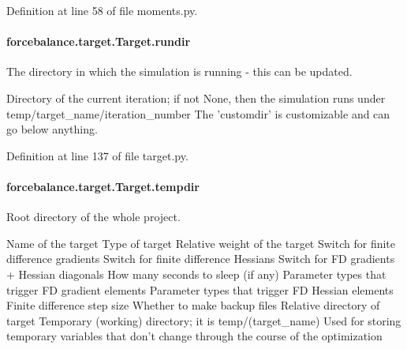 Definition at line 58 of file moments.\-py.

\hypertarget{classforcebalance_1_1target_1_1Target_a6872de5b2d4273b82336ea5b0da29c9e}{
\paragraph[{rundir}]{\setlength{\rightskip}{0pt plus 5cm}forcebalance.\-target.\-Target.\-rundir\hspace{0.3cm}{\ttfamily [inherited]}}}\label{classforcebalance_1_1target_1_1Target_a6872de5b2d4273b82336ea5b0da29c9e}


The directory in which the simulation is running -\/ this can be updated. 

Directory of the current iteration; if not None, then the simulation runs under temp/target\-\_\-name/iteration\-\_\-number The 'customdir' is customizable and can go below anything.

Definition at line 137 of file target.\-py.

\hypertarget{classforcebalance_1_1target_1_1Target_aa1f01b5b78db253b5b66384ed11ed193}{
\paragraph[{tempdir}]{\setlength{\rightskip}{0pt plus 5cm}forcebalance.\-target.\-Target.\-tempdir\hspace{0.3cm}{\ttfamily [inherited]}}}\label{classforcebalance_1_1target_1_1Target_aa1f01b5b78db253b5b66384ed11ed193}


Root directory of the whole project. 

Name of the target Type of target Relative weight of the target Switch for finite difference gradients Switch for finite difference Hessians Switch for F\-D gradients + Hessian diagonals How many seconds to sleep (if any) Parameter types that trigger F\-D gradient elements Parameter types that trigger F\-D Hessian elements Finite difference step size Whether to make backup files Relative directory of target Temporary (working) directory; it is temp/(target\-\_\-name) Used for storing temporary variables that don't change through the course of the optimization 

